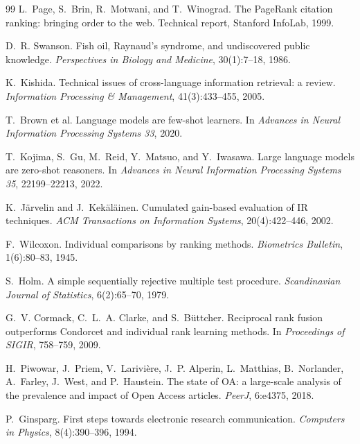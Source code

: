 \documentclass[nonacm,sigconf]{acmart}
\begin{document}
\begin{thebibliography}{99}
L.~Page, S.~Brin, R.~Motwani, and T.~Winograd.
\newblock The PageRank citation ranking: bringing order to the web.
\newblock Technical report, Stanford InfoLab, 1999.

D.~R. Swanson.
\newblock Fish oil, Raynaud's syndrome, and undiscovered public knowledge.
\newblock \emph{Perspectives in Biology and Medicine}, 30(1):7--18, 1986.

K.~Kishida.
\newblock Technical issues of cross-language information retrieval: a review.
\newblock \emph{Information Processing \& Management}, 41(3):433--455, 2005.

T.~Brown et al.
\newblock Language models are few-shot learners.
\newblock In \emph{Advances in Neural Information Processing Systems 33},
2020.

T.~Kojima, S.~Gu, M.~Reid, Y.~Matsuo, and Y.~Iwasawa.
\newblock Large language models are zero-shot reasoners.
\newblock In \emph{Advances in Neural Information Processing Systems 35},
22199--22213, 2022.

K.~J\"arvelin and J.~Kek\"al\"ainen.
\newblock Cumulated gain-based evaluation of IR techniques.
\newblock \emph{ACM Transactions on Information Systems}, 20(4):422--446,
2002.

F.~Wilcoxon.
\newblock Individual comparisons by ranking methods.
\newblock \emph{Biometrics Bulletin}, 1(6):80--83, 1945.

S.~Holm.
\newblock A simple sequentially rejective multiple test procedure.
\newblock \emph{Scandinavian Journal of Statistics}, 6(2):65--70, 1979.

G.~V. Cormack, C.~L.~A. Clarke, and S.~B\"uttcher.
\newblock Reciprocal rank fusion outperforms Condorcet and individual
rank learning methods.
\newblock In \emph{Proceedings of SIGIR}, 758--759, 2009.

H.~Piwowar, J.~Priem, V.~Larivi\`ere, J.~P. Alperin, L.~Matthias,
B.~Norlander, A.~Farley, J.~West, and P.~Haustein.
\newblock The state of OA: a large-scale analysis of the prevalence and
impact of Open Access articles.
\newblock \emph{PeerJ}, 6:e4375, 2018.

P.~Ginsparg.
\newblock First steps towards electronic research communication.
\newblock \emph{Computers in Physics}, 8(4):390--396, 1994.


\end{thebibliography}
\end{document}
